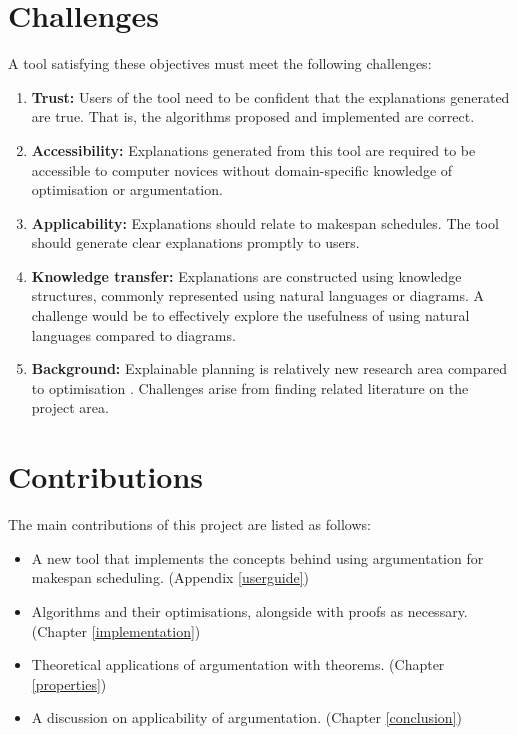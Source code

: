 \section{Challenges}
\label{challenges}

A tool satisfying these objectives must meet the following challenges:
\begin{enumerate}
	\item\textbf{Trust:} Users of the tool need to be confident that the explanations generated are true. That is, the algorithms proposed and implemented are correct.
	\item\textbf{Accessibility:} Explanations generated from this tool are required to be accessible to computer novices without domain-specific knowledge of optimisation or argumentation.
	\item\textbf{Applicability:} Explanations should relate to makespan schedules. The tool should generate clear explanations promptly to users.
	\item\textbf{Knowledge transfer:} Explanations are constructed using knowledge structures, commonly represented using natural languages or diagrams. A challenge would be to effectively explore the usefulness of using natural languages compared to diagrams.
	\item\textbf{Background:} Explainable planning is relatively new research area compared to optimisation \cite{pe}. Challenges arise from finding related literature on the project area.
\end{enumerate}

\section{Contributions}
\label{introcontributions}

The main contributions of this project are listed as follows:
\begin{itemize}
	\item A new tool \emph{\toolname} that implements the concepts behind using argumentation for makespan scheduling. (Appendix \ref{userguide})
	\item Algorithms and their optimisations, alongside with proofs as necessary. (Chapter \ref{implementation})
	\item Theoretical applications of argumentation with theorems. (Chapter \ref{properties})
	\item A discussion on applicability of argumentation. (Chapter \ref{conclusion})
\end{itemize}
